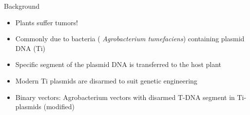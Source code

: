 \documentclass[ignorenonframetext,aspectratio=169]{beamer}
\providecommand{\tightlist}{%
  \setlength{\itemsep}{0pt}\setlength{\parskip}{0pt}}
\begin{document}
\begin{frame}{Background}
\protect\hypertarget{background}{}

\begin{itemize}
\tightlist
\item
  Plants suffer tumors!
\item
  Commonly due to bacteria ( \emph{Agrobacterium tumefaciens})
  containing plasmid DNA (Ti)
\item
  Specific segment of the plasmid DNA is transferred to the host plant
\item
  Modern Ti plasmids are disarmed to suit genetic engineering
\item
  Binary vectors: Agrobacterium vectors with disarmed T-DNA segment in
  Ti-plasmids (modified)
\end{itemize}

\end{frame}
\end{document}
